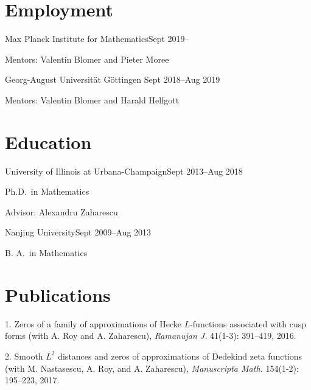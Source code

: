 \documentclass[margin,line,pifont,palatino,courier]{res}
\newenvironment{list1}{
  \begin{list}{\ding{113}}{%
      \setlength{\itemsep}{0in}
      \setlength{\parsep}{0in} \setlength{\parskip}{0in}
      \setlength{\topsep}{0in} \setlength{\partopsep}{0in}
      \setlength{\leftmargin}{0.17in}}}{\end{list}}
\begin{document}
\begin{resume}
\section{\sc Employment} 
{Max Planck Institute for Mathematics}\hfill{Sept 2019--}

\begin{list1}

		\item[] Mentors: Valentin Blomer and Pieter Moree

\end{list1}
{Georg-August Universit\"at G\"ottingen} \hfill{Sept 2018--Aug 2019}

\begin{list1}

		\item[] Mentors: Valentin Blomer and Harald Helfgott


\end{list1}
\section{\sc Education}

{University of Illinois at Urbana-Champaign}\hfill{Sept 2013--Aug 2018}\\
\vspace*{-.1in}
\begin{list1}
\item[] Ph.D.~in Mathematics
\item[] Advisor: Alexandru Zaharescu

\end{list1}

{ Nanjing University}\hfill{Sept 2009--Aug 2013}\\
\vspace*{-.1in}
\begin{list1}
\item[] B. A.~in Mathematics

\end{list1}






\section{\sc Publications}
1. {Zeros of a family of approximations of {H}ecke {$L$}-functions
associated with cusp forms} (with A. Roy and A. Zaharescu), {\it Ramanujan J.} 41(1-3): 391--419, 2016.

2. {Smooth {$L^2$} distances and zeros of approximations of {D}edekind
	zeta functions} (with M. Nastasescu, A. Roy, and A. Zaharescu), {\it Manuscripta Math.} 154(1-2): 195--223, 2017.
	

\end{resume}
\end{document}
